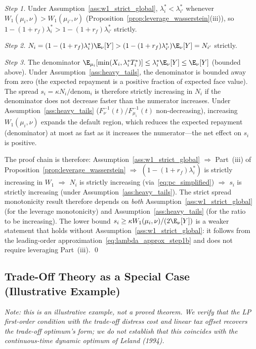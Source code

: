 \emph{Step 1.} Under Assumption~\ref{ass:w1_strict_global}, $\lambda_i^* < \lambda_{i'}^*$ whenever $W_1(\mu_i,\nu) > W_1(\mu_{i'},\nu)$ (Proposition~\ref{prop:leverage_wasserstein}(iii)), so $1 - (1+r_f)\lambda_i^* > 1-(1+r_f)\lambda_{i'}^*$ strictly.

\emph{Step 2.} $N_i = (1-(1+r_f)\lambda_i^*)\E_\nu[Y] > (1-(1+r_f)\lambda_{i'}^*)\E_\nu[Y] = N_{i'}$ strictly.

\emph{Step 3.} The denominator $\E_{\mu_i}[\min(X_i,\lambda_i^* T_i^*)] \leq \lambda_i^*\E_\nu[Y] \leq \E_\nu[Y]$ (bounded above). Under Assumption~\ref{ass:heavy_tails}, the denominator is bounded away from zero (the expected repayment is a positive fraction of expected face value). The spread $s_i = \kappa N_i / \mathrm{denom}_i$ is therefore strictly increasing in $N_i$ if the denominator does not decrease faster than the numerator increases. Under Assumption~\ref{ass:heavy_tails} ($F_\nu^{-1}(t)/F_{\mu_i}^{-1}(t)$ non-decreasing), increasing $W_1(\mu_i,\nu)$ expands the default region, which reduces the expected repayment (denominator) at most as fast as it increases the numerator---the net effect on $s_i$ is positive.

The proof chain is therefore: Assumption~\ref{ass:w1_strict_global} $\Rightarrow$ Part~(iii) of Proposition~\ref{prop:leverage_wasserstein} $\Rightarrow$ $(1-(1+r_f)\lambda_i^*)$ is strictly increasing in $W_1$ $\Rightarrow$ $N_i$ is strictly increasing (via~\eqref{eq:pc_simplified}) $\Rightarrow$ $s_i$ is strictly increasing (under Assumption~\ref{ass:heavy_tails}). The strict spread monotonicity result therefore depends on \emph{both} Assumption~\ref{ass:w1_strict_global} (for the leverage monotonicity) and Assumption~\ref{ass:heavy_tails} (for the ratio to be increasing). The lower bound $s_i \geq \kappa W_1(\mu_i,\nu)/(2\E_\nu[Y])$ is a weaker statement that holds without Assumption~\ref{ass:w1_strict_global}: it follows from the leading-order approximation~\eqref{eq:lambda_approx_step1b} and does not require leveraging Part~(iii). \qed

\subsection*{Trade-Off Theory as a Special Case (Illustrative Example)}

\emph{Note: this is an illustrative example, not a proved theorem. We verify that the LP first-order condition with the trade-off distress cost and linear tax offset recovers the trade-off optimum's form; we do not establish that this coincides with the continuous-time dynamic optimum of Leland (1994).}

